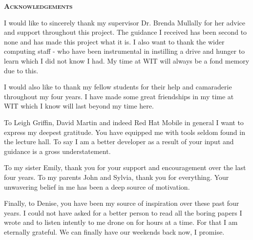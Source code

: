 \begin{center}
{\scshape\LARGE \textbf{Acknowledgements}\par}
\end{center}
\thispagestyle{empty}
\vspace{1cm}
I would like to sincerely thank my supervisor Dr. Brenda Mullally for her advice and support throughout this project. The guidance I received has been second to none and has made this project what it is. I also want to thank the wider computing staff - who have been instrumental in instilling a drive and hunger to learn which I did not know I had. My time at WIT will always be a fond memory due to this. 

I would also like to thank my fellow students for their help and camaraderie throughout my four years. I have made some great friendships in my time at WIT which I know will last beyond my time here.

To Leigh Griffin, David Martin and indeed Red Hat Mobile in general I want to express my deepest gratitude. You have equipped me with tools seldom found in the lecture hall. To say I am a better developer as a result of your input and guidance is a gross understatement.

To my sister Emily, thank you for your support and encouragement over the last four years. To my parents John and Sylvia, thank you for everything. Your unwavering belief in me has been a deep source of motivation.

Finally, to Denise, you have been my source of inspiration over these past four years. I could not have asked for a better person to read all the boring papers I wrote and to listen intently to me drone on for hours at a time. For that I am eternally grateful. We can finally have our weekends back now, I promise.

\clearpage

